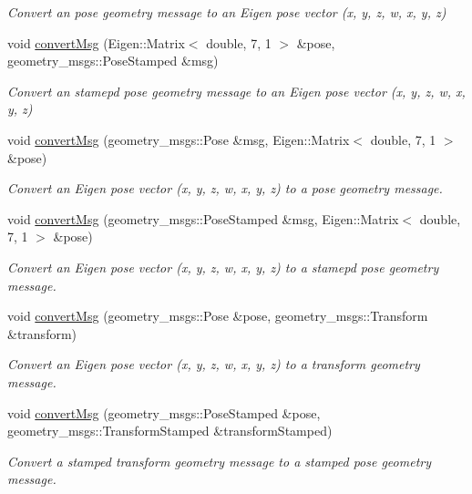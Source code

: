 \begin{DoxyCompactItemize}
\begin{DoxyCompactList}\small\item\em Convert an pose geometry message to an Eigen pose vector (x, y, z, w, x, y, z) \end{DoxyCompactList}\item 
void \hyperlink{group__MultiRobotController_ga9e842115a5f448ab0e3ba9fea93d5179}{convert\+Msg} (Eigen\+::\+Matrix$<$ double, 7, 1 $>$ \&pose, geometry\+\_\+msgs\+::\+Pose\+Stamped \&msg)
\begin{DoxyCompactList}\small\item\em Convert an stamepd pose geometry message to an Eigen pose vector (x, y, z, w, x, y, z) \end{DoxyCompactList}\item 
void \hyperlink{group__MultiRobotController_ga7beb50c98e49263d05b3b819be58d76c}{convert\+Msg} (geometry\+\_\+msgs\+::\+Pose \&msg, Eigen\+::\+Matrix$<$ double, 7, 1 $>$ \&pose)
\begin{DoxyCompactList}\small\item\em Convert an Eigen pose vector (x, y, z, w, x, y, z) to a pose geometry message. \end{DoxyCompactList}\item 
void \hyperlink{group__MultiRobotController_gaf1628de186f2d90b064f8c8b36beef53}{convert\+Msg} (geometry\+\_\+msgs\+::\+Pose\+Stamped \&msg, Eigen\+::\+Matrix$<$ double, 7, 1 $>$ \&pose)
\begin{DoxyCompactList}\small\item\em Convert an Eigen pose vector (x, y, z, w, x, y, z) to a stamepd pose geometry message. \end{DoxyCompactList}\item 
void \hyperlink{group__MultiRobotController_ga45b2bbef58d2c60ff8eeb77d221f2ab7}{convert\+Msg} (geometry\+\_\+msgs\+::\+Pose \&pose, geometry\+\_\+msgs\+::\+Transform \&transform)
\begin{DoxyCompactList}\small\item\em Convert an Eigen pose vector (x, y, z, w, x, y, z) to a transform geometry message. \end{DoxyCompactList}\item 
void \hyperlink{group__MultiRobotController_gaf99f4d3d714176ee5a3d235ffabb7d3f}{convert\+Msg} (geometry\+\_\+msgs\+::\+Pose\+Stamped \&pose, geometry\+\_\+msgs\+::\+Transform\+Stamped \&transform\+Stamped)
\begin{DoxyCompactList}\small\item\em Convert a stamped transform geometry message to a stamped pose geometry message. \end{DoxyCompactList}\item 

\end{DoxyCompactItemize}
